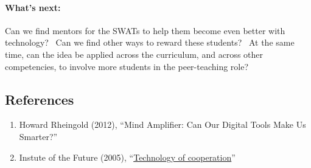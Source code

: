 \paragraph{What's next:}
Can we find mentors for the SWATs to help them become even better with
technology? ~Can we find other ways to reward these students? ~At the
same time, can the idea be applied across the curriculum, and across
other competencies, to involve more students in the peer-teaching role?

\subsection{References}

\begin{enumerate}
\item
  Howard Rheingold (2012), ``Mind Amplifier: Can Our Digital Tools Make
  Us Smarter?''
\item
  Instute of the Future (2005), ``\href{http://www.rheingold.com/cooperation/Technology_of_cooperation.pdf}{Technology of cooperation}''
\end{enumerate}


